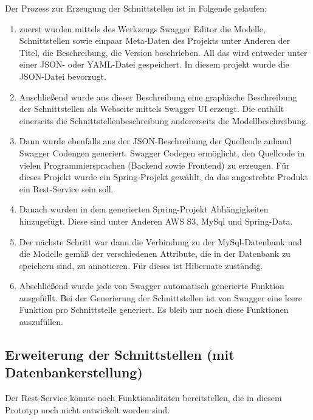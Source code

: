 \documentclass[a4paper,twoside]{article}
\begin{document}
	Der Prozess zur Erzeugung der Schnittstellen ist in Folgende gelaufen:
	\begin{enumerate}
		\item zuerst wurden mittels des Werkzeugs Swagger Editor die Modelle, Schnittstellen sowie einpaar Meta-Daten des Projekts unter Anderen der Titel, die Beschreibung, die Version beschrieben. All das wird entweder unter einer JSON- oder YAML-Datei gespeichert. In diesem projekt wurde die JSON-Datei bevorzugt.
		
		\item Anschlie\ss{}end wurde aus dieser Beschreibung eine graphische Beschreibung der Schnittstellen als Webseite mittels Swagger UI erzeugt. Die enth\"alt einerseits die Schnittstellenbeschreibung andererseits die Modellbeschreibung.
		
		\item Dann wurde ebenfalls aus der JSON-Beschreibung der Quellcode anhand Swagger Codengen generiert. Swagger Codegen erm\"oglicht, den Quellcode in vielen Programmiersprachen (Backend sowie Frontend) zu erzeugen. F\"ur dieses Projekt wurde ein Spring-Projekt gew\"ahlt, da das angestrebte Produkt ein Rest-Service sein soll.
		
		\item Danach wurden in dem generierten Spring-Projekt Abh\"angigkeiten hinzugef\"ugt. Diese sind unter Anderen AWS S3, MySql und Spring-Data.
		
		\item Der n\"achste Schritt war dann die Verbindung zu der MySql-Datenbank und die Modelle gem\"a\ss{} der verschiedenen Attribute, die in der Datenbank zu speichern sind, zu annotieren. F\"ur dieses ist Hibernate zust\"andig.
		
		\item Abschlie\ss{}end wurde jede von Swagger automatisch generierte Funktion ausgef\"ullt. Bei der Generierung der Schnittstellen ist von Swagger eine leere Funktion pro Schnittstelle generiert. Es bleib nur noch diese Funktionen auszuf\"ullen.
	\end{enumerate}
	
	\subsection{Erweiterung der Schnittstellen (mit Datenbankerstellung)}
	
	Der Rest-Service k\"onnte noch Funktionalit\"aten bereitstellen, die in diesem Prototyp noch nicht entwickelt worden sind.
	
\end{document}
